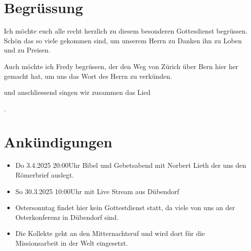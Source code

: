 
\section{Begrüssung}

Ich möchte euch alle recht herzlich zu diesem besonderen Gottesdienst begrüssen. Schön das so viele gekommen sind, um unserem Herrn zu Danken ihn zu Loben und zu Preisen.

Auch möchte ich Fredy begrüssen, der den Weg von Zürich über Bern hier her gemacht hat, um uns das Wort des Herrn zu verkünden. 

\noindent
\beten{} und anschliessend singen wir zusammen das Lied

\noindent
{}.

\section{Ankündigungen}
\begin{itemize}
    \item {} Do 3.4.2025 20:00Uhr Bibel und Gebetsabend mit Norbert Lieth der uns den Römerbrief auslegt.
    \item {} So 30.3.2025 10:00Uhr mit Live Stream aus Dübendorf
    \item {} Ostersonntag findet hier kein Gottestdienst statt, da viele von uns an der Osterkonferenz in Dübendorf sind.
    \item {} Die Kollekte geht an den Mitternachtsruf und wird dort für die Missionsarbeit in der Welt eingesetzt.
\end{itemize}


